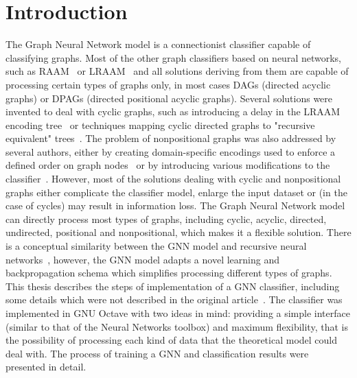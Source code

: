 
\chapter{Introduction}
The Graph Neural Network model is a connectionist classifier capable of classifying graphs. Most of the other graph classifiers based on neural networks, such as RAAM~\cite{pollack1990recursive} or LRAAM~\cite{sperduti1994labelling} and all solutions deriving from them are capable of processing certain types of graphs only, in most cases DAGs (directed acyclic graphs) or DPAGs (directed positional acyclic graphs).
Several solutions were invented to deal with cyclic graphs, such as introducing a delay in the LRAAM encoding tree~\cite{goulon2005hopfield} or techniques mapping cyclic directed graphs to "recursive equivalent" trees~\cite{bianchini2003backpropagation}.
The problem of nonpositional graphs was also addressed by several authors, either by creating domain-specific encodings used to enforce a defined order on graph nodes~\cite{ivanciuc2003canonical} or by introducing various modifications to the classifier~\cite{bianchini2005recursive}.
However, most of the solutions dealing with cyclic and nonpositional graphs either complicate the classifier model, enlarge the input dataset or (in the case of cycles) may result in information loss. The Graph Neural Network model can directly process most types of graphs, including cyclic, acyclic, directed, undirected, positional and nonpositional, which makes it a flexible solution.
There is a conceptual similarity between the GNN model and recursive neural networks~\cite{frasconi1998general}, however, the GNN model adapts a novel learning and backpropagation schema which simplifies processing different types of graphs.
This thesis describes the steps of implementation of a GNN classifier, including some details which were not described in the original article~\cite{scarselli2009graph}. The classifier was implemented in GNU Octave with two ideas in mind: providing a simple interface (similar to that of the Neural Networks toolbox) and maximum flexibility, that is the possibility of processing each kind of data that the theoretical model could deal with. The process of training a GNN and classification results were presented in detail.

